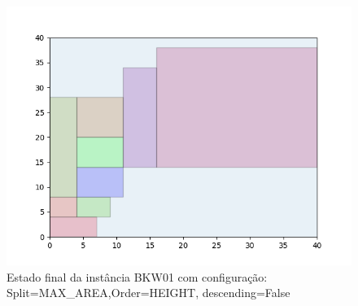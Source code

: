 \begin{figure}[H]
    \centering
    \caption[]{Estado final da instância BKW01 com configuração: Split=MAX_AREA,Order=HEIGHT, descending=False}
    \label{fig:bkw01-max_area-height-false}
    \includegraphics[scale=0.5]{output/figures/bkw/bkw01/max_area/height/false/00}
\end{figure}